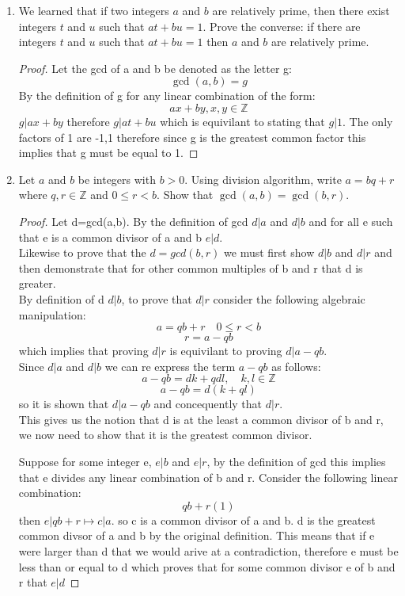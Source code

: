 \documentclass[11pt]{article}
\theoremstyle{definition}  %
\newcommand{\Z}{\mathbb{Z}}
\begin{document}
\begin{enumerate}
\item We learned that if two integers $a$ and $b$ are relatively prime, then there exist integers $t$ and $u$ such that $at + bu = 1$.
Prove the converse: if there are integers $t$ and $u$ such that $at + bu = 1$ then $a$ and $b$ are relatively prime.
\begin{proof}
Let the gcd of a and b be denoted as the letter g:
\[
  \gcd(a,b)=g
\]
By the definition of g for any linear combination of the form: \[
  ax+by, x,y\in \Z
\]
$g|ax+by$ therefore $g|at+bu$ which is equivilant to stating that $g|1$. The only factors of 1 are -1,1 therefore since g is the greatest common factor this implies that g must be equal to 1.

\end{proof}
\item Let $a$ and $b$ be integers with $b >0$. Using division algorithm, write $a = bq + r$ where $q, r \in \Z$ and $0 \leq r < b$. Show that $\gcd(a,b) = \gcd(b, r)$.
\begin{proof}
Let d=gcd(a,b). By the definition of gcd $d|a$ and $d|b$ and for all e such that e is a common divisor of a and b $e|d$. \\
Likewise to prove that the $d=gcd(b,r)$ we must first show $d|b$ and $d|r$ and then demonstrate that for other common multiples of b and r that d is greater. \\
By definition of d $d|b$, to prove that $d|r$ consider the following algebraic manipulation:
\[
  a=qb+r \quad 0\leq r <b
\]
\[
  r=a-qb
\]
which implies that proving $d|r$ is equivilant to proving $d|a-qb$.\\
Since $d|a$ and $d|b$ we can re express the term $a-qb$ as follows:
\[
  a-qb=dk+qdl,\quad k,l\in \Z
\]
\[
  a-qb=d(k+ql)
\]
so it is shown that $d|a-qb$ and concequently that $d|r$. \\
This gives us the notion that d is at the least a common divisor of b and r, we now need to show that it is the greatest common divisor.

Suppose for some integer e, $e|b$ and $e|r$,
by the definition of gcd this implies that e divides any linear combination of b and r. Consider the following linear combination:
\[
  qb+r(1)
\]
then $e|qb+r\mapsto c|a$. so c is a common divisor of a and b. d is the greatest common divsor of a and b by the original definition. This means that if e were larger than d that we would arive at a contradiction, therefore e must be less than or equal to d which proves that for some common divisor e of b and r that $e|d$


\end{proof}
\end{enumerate}
\end{document}
